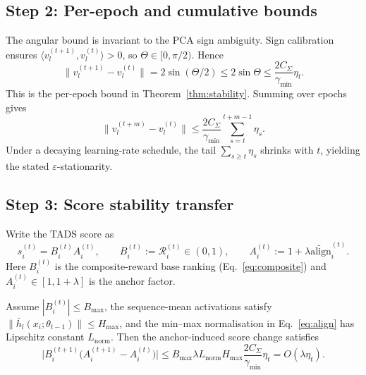 \subsection{Step 2: Per-epoch and cumulative bounds}
\label{app:step-euclidean}

The angular bound is invariant to the PCA sign ambiguity. Sign
calibration ensures
$\langle v_l^{(t+1)},v_l^{(t)}\rangle>0$, so
$\Theta\in[0,\pi/2)$. Hence
\begin{equation}
  \bigl\|v_l^{(t+1)}-v_l^{(t)}\bigr\|
  =
  2\sin(\Theta/2)
  \le
  2\sin\Theta
  \le
  \frac{2C_\Sigma}{\gamma_{\min}}\eta_t .
  \label{eq:perepoch-bound}
\end{equation}
This is the per-epoch bound in Theorem~\ref{thm:stability}. Summing
over epochs gives
\begin{equation}
  \bigl\|v_l^{(t+m)}-v_l^{(t)}\bigr\|
  \le
  \frac{2C_\Sigma}{\gamma_{\min}}
  \sum_{s=t}^{t+m-1}\eta_s .
  \label{eq:cumulative-bound-app}
\end{equation}
Under a decaying learning-rate schedule, the tail
$\sum_{s\ge t}\eta_s$ shrinks with $t$, yielding the stated
$\varepsilon$-stationarity.

\subsection{Step 3: Score stability transfer}
\label{app:score-stability}

Write the \textsc{TADS} score as
\[
s_i^{(t)} = B_i^{(t)}A_i^{(t)},
\qquad
B_i^{(t)} := \mathcal{R}_i^{(t)} \in (0,1),
\qquad
A_i^{(t)} := 1+\lambda\widetilde{\mathrm{align}}_i^{(t)} .
\]
Here $B_i^{(t)}$ is the composite-reward base ranking
(Eq.~\ref{eq:composite}) and $A_i^{(t)}\in[1,1+\lambda]$ is the
anchor factor.

\begin{corollary}
\label{cor:score-stability}
Assume $|B_i^{(t)}|\le B_{\max}$, the sequence-mean activations
satisfy $\|\bar h_l(x_i;\theta_{t-1})\|\le H_{\max}$, and the
min--max normalisation in Eq.~\ref{eq:align} has Lipschitz constant
$L_{\mathrm{norm}}$. Then the anchor-induced score change satisfies
\begin{equation}
  \bigl|
  B_i^{(t+1)}
  \bigl(A_i^{(t+1)}-A_i^{(t)}\bigr)
  \bigr|
  \le
  B_{\max}\lambda L_{\mathrm{norm}}H_{\max}
  \frac{2C_\Sigma}{\gamma_{\min}}\eta_t
  =
  O(\lambda\eta_t).
  \label{eq:cor-score-bound}
\end{equation}
\end{corollary}

